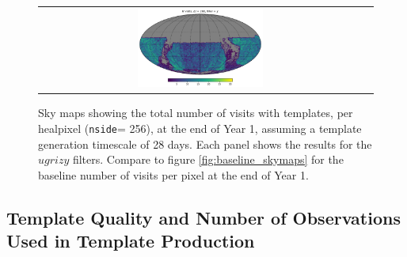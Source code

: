 \documentclass[preprintm,linenumbers]{aastex631}
\newcommand{\nside}{\texttt{nside}\xspace}
\begin{document}
\begin{figure}
\begin{tabular}{c c}
				\includegraphics[width=0.4\textwidth]{results/skymaps/skymap_first_year_one_snap_v4_0_10yrs_db_noDD_noTwi_tscale-28_nside-256_doAllTemplateMetrics_reduceCount_y_noDD_noTwi.pdf} \\
			\end{tabular}
			\caption{Sky maps showing the total number of visits with templates, per healpixel (\nside = 256), at the end of Year 1, assuming a template generation timescale of 28 days. Each panel shows the results for the $ugrizy$ filters.
				Compare to figure \ref{fig:baseline_skymaps} for the baseline number of visits per pixel at the end of Year 1.
			}
			\label{fig:template_skymaps_tscale-28}
		\end{figure}

  


		\subsection{Template Quality and Number of Observations Used in Template Production}
		
\end{document}
